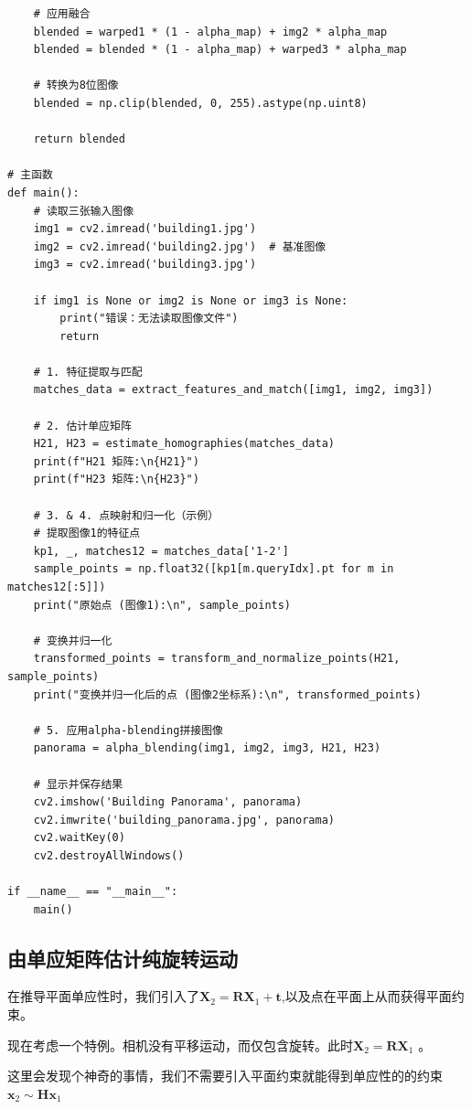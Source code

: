 \documentclass{article}
\begin{document}
\begin{lstlisting}
    # 应用融合
    blended = warped1 * (1 - alpha_map) + img2 * alpha_map
    blended = blended * (1 - alpha_map) + warped3 * alpha_map
    
    # 转换为8位图像
    blended = np.clip(blended, 0, 255).astype(np.uint8)
    
    return blended

# 主函数
def main():
    # 读取三张输入图像
    img1 = cv2.imread('building1.jpg')
    img2 = cv2.imread('building2.jpg')  # 基准图像
    img3 = cv2.imread('building3.jpg')
    
    if img1 is None or img2 is None or img3 is None:
        print("错误：无法读取图像文件")
        return
    
    # 1. 特征提取与匹配
    matches_data = extract_features_and_match([img1, img2, img3])
    
    # 2. 估计单应矩阵
    H21, H23 = estimate_homographies(matches_data)
    print(f"H21 矩阵:\n{H21}")
    print(f"H23 矩阵:\n{H23}")
    
    # 3. & 4. 点映射和归一化（示例）
    # 提取图像1的特征点
    kp1, _, matches12 = matches_data['1-2']
    sample_points = np.float32([kp1[m.queryIdx].pt for m in matches12[:5]])
    print("原始点 (图像1):\n", sample_points)
    
    # 变换并归一化
    transformed_points = transform_and_normalize_points(H21, sample_points)
    print("变换并归一化后的点 (图像2坐标系):\n", transformed_points)
    
    # 5. 应用alpha-blending拼接图像
    panorama = alpha_blending(img1, img2, img3, H21, H23)
    
    # 显示并保存结果
    cv2.imshow('Building Panorama', panorama)
    cv2.imwrite('building_panorama.jpg', panorama)
    cv2.waitKey(0)
    cv2.destroyAllWindows()

if __name__ == "__main__":
    main()
\end{lstlisting}

\subsection{由单应矩阵估计纯旋转运动}

在推导平面单应性时，我们引入了$\mathbf{X}_2=\mathbf{R}\mathbf{X}_1+\mathbf{t}$,以及点在平面上从而获得平面约束。

现在考虑一个特例。相机没有平移运动，而仅包含旋转。此时$\mathbf{X}_2=\mathbf{R}\mathbf{X}_1$ 。

这里会发现个神奇的事情，我们不需要引入平面约束就能得到单应性的的约束$\mathbf{x}_2\sim\mathbf{H}\mathbf{x}_1$
\end{document}
